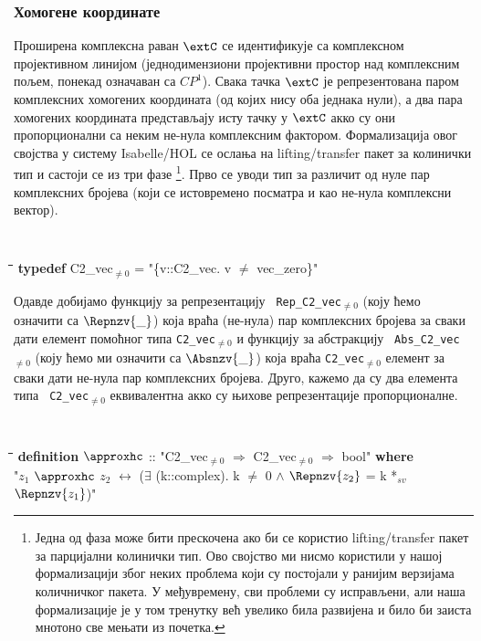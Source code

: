 \subsubsection{Хомогене координате}
Проширена комплексна раван $\extC$ се идентификује са комплексном
пројективном линијом (једнодимензиони пројективни простор над
комплексним пољем, понекад означаван са $CP^1$). Свака тачка $\extC$
је репрезентована паром комплексних хомогених координата (од којих
нису оба једнака нули), а два пара хомогених координата представљају
исту тачку у $\extC$ акко су они пропорционални са неким не-нула
комплексним фактором. Формализација овог својства у систему
Isabelle/HOL се ослања на lifting/transfer пакет за колинички тип
\cite{lifting-transfer} и састоји се из три фазе \footnote{Једна од
  фаза може бити прескочена ако би се користио lifting/transfer пакет
  за парцијални колинички тип. Ово својство ми нисмо користили у нашој
  формализацији због неких проблема који су постојали у ранијим
  верзијама количничког пакета. У међувремену, сви проблеми су
  исправљени, али наша формализације је у том тренутку већ увелико
  била развијена и било би заиста мнотоно све мењати из
  почетка.}. Прво се уводи тип за различит од нуле пар комплексних
бројева (који се истовремено посматра и као не-нула комплексни
вектор).

{\tt
\begin{tabbing}
\hspace{5mm}\=\hspace{5mm}\=\hspace{5mm}\=\hspace{5mm}\=\hspace{5mm}\=\kill
{\bf typedef} C2\_vec$_{\neq 0}$ = "\{v::C2\_vec. v $\neq$ vec\_zero\}"
\end{tabbing}
}
\noindent Одавде добијамо функцију за репрезентацију {\tt
  Rep\_C2\_vec$_{\neq 0}$} (коју ћемо означити са $\Repnzv{\_}$) која
враћа (не-нула) пар комплексних бројева за сваки дати елемент помоћног
типа {\tt C2\_vec$_{\neq 0}$} и функцију за абстракцију {\tt
  Abs\_C2\_vec$_{\neq 0}$} (коју ћемо ми означити са $\Absnzv{\_}$)
која враћа {\tt C2\_vec$_{\neq 0}$} елемент за сваки дати не-нула пар
комплексних бројева. Друго, кажемо да су два елемента типа {\tt
  C2\_vec$_{\neq 0}$} еквивалентна акко су њихове репрезентације
пропорционалне.

{\tt
\begin{tabbing}
\hspace{5mm}\=\hspace{5mm}\=\hspace{5mm}\=\hspace{5mm}\=\hspace{5mm}\=\kill
{\bf definition} $\approxhc$ :: "C2\_vec$_{\neq 0}$ $\Rightarrow$ C2\_vec$_{\neq 0}$ $\Rightarrow$ bool" {\bf where}\\
\> "$z_1$ $\approxhc$ $z_2$ $\longleftrightarrow$ ($\exists$ (k::complex). k $\neq$ 0 $\wedge$ $\Repnzv{z_2}$ = k *$_{sv}$ $\Repnzv{z_1}$)"
\end{tabbing}
}


